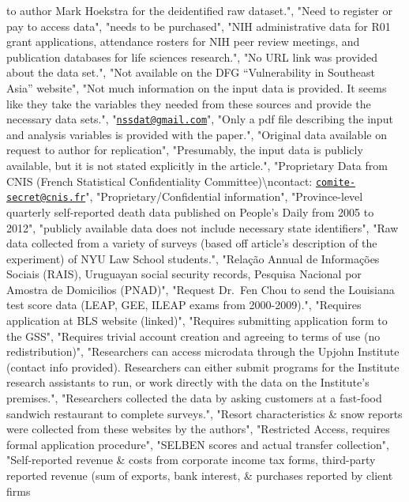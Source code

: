 \documentclass[]{article}
\begin{document}
\begin{itemize}
  to author Mark Hoekstra for the deidentified raw dataset.", "Need to
  register or pay to access data", "needs to be purchased", "NIH
  administrative data for R01 grant applications, attendance rosters for
  NIH peer review meetings, and publication databases for life sciences
  research.", "No URL link was provided about the data set.", "Not
  available on the DFG ``Vulnerability in Southeast Asia'' website",
  "Not much information on the input data is provided. It seems like
  they take the variables they needed from these sources and provide the
  necessary data sets.",
  "\href{mailto:nssdat@gmail.com}{\nolinkurl{nssdat@gmail.com}}", "Only
  a pdf file describing the input and analysis variables is provided
  with the paper.", "Original data available on request to author for
  replication", "Presumably, the input data is publicly available, but
  it is not stated explicitly in the article.", "Proprietary Data from
  CNIS (French Statistical Confidentiality
  Committee)\textbackslash{}ncontact:
  \href{mailto:comite-secret@cnis.fr}{\nolinkurl{comite-secret@cnis.fr}}",
  "Proprietary/Confidential information", "Province-level quarterly
  self-reported death data published on People's Daily from 2005 to
  2012", "publicly available data does not include necessary state
  identifiers", "Raw data collected from a variety of surveys (based off
  article's description of the experiment) of NYU Law School students.",
  "Relação Annual de Informações Sociais (RAIS), Uruguayan social
  security records, Pesquisa Nacional por Amostra de Domicilios (PNAD)",
  "Request Dr.~Fen Chou to send the Louisiana test score data (LEAP,
  GEE, ILEAP exams from 2000-2009).", "Requires application at BLS
  website (linked)", "Requires submitting application form to the GSS",
  "Requires trivial account creation and agreeing to terms of use (no
  redistribution)", "Researchers can access microdata through the Upjohn
  Institute (contact info provided). Researchers can either submit
  programs for the Institute research assistants to run, or work
  directly with the data on the Institute's premises.", "Researchers
  collected the data by asking customers at a fast-food sandwich
  restaurant to complete surveys.", "Resort characteristics \& snow
  reports were collected from these websites by the authors",
  "Restricted Access, requires formal application procedure", "SELBEN
  scores and actual transfer collection", "Self-reported revenue \&
  costs from corporate income tax forms, third-party reported revenue
  (sum of exports, bank interest, \& purchases reported by client firms

\end{itemize}
\end{document}
